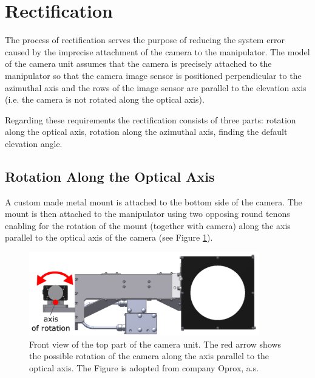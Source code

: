 \section{Rectification}

The process of rectification serves the purpose of reducing the system error caused by the imprecise attachment of the camera to the manipulator. The model of the camera unit assumes that the camera is precisely attached to the manipulator so that the camera image sensor is positioned perpendicular to the azimuthal axis and the rows of the image sensor are parallel to the elevation axis (i.e. the camera is not rotated along the optical axis).

Regarding these requirements the rectification consists of three parts: rotation along the optical axis, rotation along the azimuthal axis, finding the default elevation angle.


\subsection{Rotation Along the Optical Axis}

A custom made metal mount is attached to the bottom side of the camera. The mount is then attached to the manipulator using two opposing round tenons enabling for the rotation of the mount (together with camera) along the axis parallel to the optical axis of the camera (see Figure \ref{fig:rect_model_front_view}).

\begin{figure}[htb]
	\centering
	\includegraphics[width=10cm]{fig/rect_model_front_view.png}
	\caption{Front view of the top part of the camera unit. The red arrow shows the possible rotation of the camera along the axis parallel to the optical axis. The Figure is adopted from company Oprox, a.s.}
	\label{fig:rect_model_front_view}
\end{figure}

